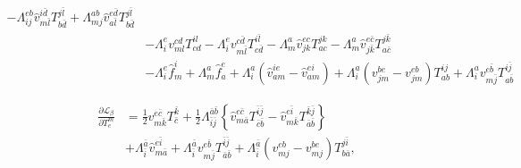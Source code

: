 \documentclass[a4paper,12pt,oneside]{book}
\newcommand{\spa}[1]{{#1}}
\newcommand{\spb}[1]{\bar{#1}}
\newcommand{\half}{\frac{1}{2}}
\begin{document}
\begin{equation}
\begin{aligned}
- Λ_{\spa{i}\spa{j}}^{\spa{e}\spa{b}} 
\hat v_{\spa{m}\spb{l}}^{\spa{i}\spb{d}} T^{\spa{j}\spb{l}}_{\spa{b}\spb{d}} 
+ Λ_{\spa{m}\spa{j}}^{\spa{a}\spa{b}}
\hat v_{\spa{a}\spb{l}}^{\spa{e}\spb{d}} T^{\spa{j}\spb{l}}_{\spa{b}\spb{d}} \\
&-Λ_{\spa{i}}^{\spa{e}} v_{\spa{m}\spa{l}}^{\spa{c}\spa{d}} T^{\spa{i}\spa{l}}_{\spa{c}\spa{d}}  
-Λ_{\spa{i}}^{\spa{e}} v_{\spa{m}\spb{l}}^{\spa{c}\spb{d}} T^{\spa{i}\spb{l}}_{\spa{c}\spb{d}}
- Λ_{\spa{m}}^{\spa{a}} \hat v_{\spa{j}\spa{k}}^{\spa{e}\spa{c}} T^{\spa{j}\spa{k}}_{\spa{a}\spa{c}}
- Λ_{\spa{m}}^{\spa{a}} \hat v_{\spa{j}\spb{k}}^{\spa{e}\spb{c}} T^{\spa{j}\spb{k}}_{\spa{a}\spb{c}}\\
&-Λ_{\spa{i}}^{\spa{e}} \hat f_{\spa{m}}^{\spa{i}} 
+Λ_{\spa{m}}^{\spa{a}} \hat f_{\spa{a}}^{\spa{e}} 
+Λ_{\spa{i}}^{\spa{a}} \left(\hat v_{\spa{a}\spa{m}}^{\spa{i}\spa{e}} - \hat v_{\spa{a}\spa{m}}^{\spa{e}\spa{i}} \right)
+ Λ_{\spa{i}}^{\spa{a}} \left(v_{\spa{j}\spa{m}}^{\spa{b}\spa{e}} - v_{\spa{j}\spa{m}}^{\spa{e}\spa{b}} \right) T^{\spa{i}\spa{j}}_{\spa{a}\spa{b}} 
+ Λ_{\spa{i}}^{\spa{a}} v_{\spa{m}\spb{j}}^{\spa{e}\spb{b}} T^{\spa{i}\spb{j}}_{\spa{a}\spb{b}} 
\end{aligned}
\end{equation}

\begin{equation}
\begin{aligned}
\frac{\partial\mathcal{L}_{\beta}}{\partial T^{\spa{m}}_{\spa{e}}}&=
\half v_{\spa{m}\spb{k}}^{\spa{e}\spb{c}} T^{\spb{k}}_{\spb{c}}
 + \half Λ_{\spb{i}\spb{j}}^{\spb{a}\spb{b}} \left\{
  \hat v_{\spa{m}\spb{a}}^{\spa{e}\spb{c}} T^{\spb{i}\spb{j}}_{\spb{c}\spb{b}}
- \hat v_{\spa{m}\spb{k}}^{\spa{e}\spb{i}} T^{\spb{k}\spb{j}}_{\spb{a}\spb{b}} \right\}\\
&+Λ_{\spb{i}}^{\spb{a}} \hat v_{\spa{m}\spb{a}}^{\spa{e}\spb{i}} 
+ Λ_{\spb{i}}^{\spb{a}} v_{\spa{m}\spb{j}}^{\spa{e}\spb{b}} T^{\spb{i}\spb{j}}_{\spb{a}\spb{b}} 
+ Λ_{\spb{i}}^{\spb{a}} \left(v_{\spa{m}\spa{j}}^{\spa{e}\spa{b}} - v_{\spa{m}\spa{j}}^{\spa{b}\spa{e}} \right) T^{\spa{j}\spb{i}}_{\spa{b}\spb{a}}, 
\end{aligned}
\end{equation}
\end{document}
